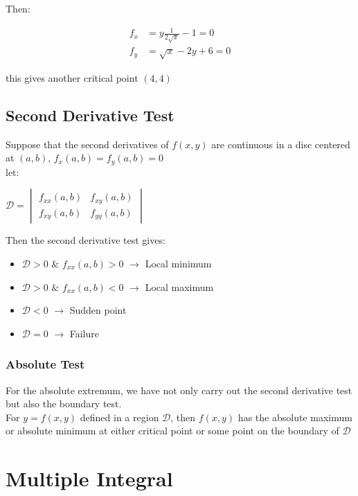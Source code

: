 \documentclass[UTF8,a4paper, 10pt, openany]{svmono}
\begin{document}
Then:

\begin{align*}
f_x &=y\frac{1}{2\sqrt{x}}-1=0\\
f_y &=\sqrt{x}-2y+6=0
\end{align*}

this gives another critical point $(4,4)$

\section{Second Derivative Test}
Suppose that the second derivatives of $f(x,y)$ are continuous in a disc centered at $(a,b)$, $f_x(a,b)=f_y(a,b)=0$\\

let:
\begin{center}
$\boxed{\mathcal{D}=
\begin{vmatrix}
f_{xx}(a,b) & f_{xy}(a,b)\\
f_{xy}(a,b) & f_{yy}(a,b)
\end{vmatrix}
}$
\end{center}

Then the second derivative test gives:

\begin{itemize}
\item $\mathcal{D}>0$ $\&$ $f_{xx}(a,b)>0$ $\rightarrow$ Local minimum\\
\item $\mathcal{D}>0$ $\&$ $f_{xx}(a,b)<0$ $\rightarrow$ Local maximum\\
\item $\mathcal{D}<0$ $\rightarrow$ Sudden point \\
\item $\mathcal{D}=0$ $\rightarrow$ Failure
\end{itemize}

\subsection{Absolute Test}
For the absolute extremum, we have not only carry out the second derivative test but also the boundary test.\\
For $y=f(x,y)$ defined in a region $\mathcal{D}$, then $f(x,y)$ has the absolute maximum or absolute minimum at either critical point or some point on the boundary of $\mathcal{D}$

\chapter{Multiple Integral}
\end{document}
